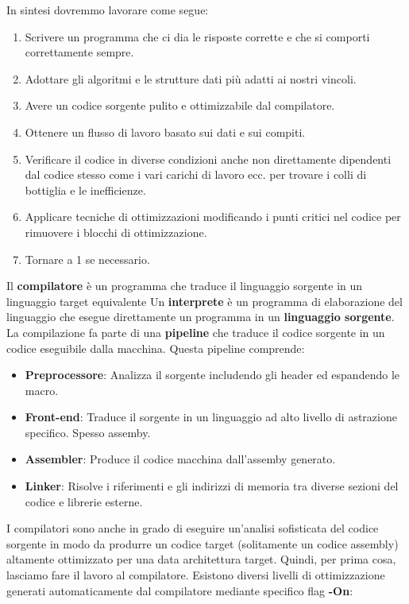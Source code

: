 In sintesi dovremmo lavorare come segue:
\begin{enumerate}
    \item Scrivere un programma che ci dia le risposte corrette e che si comporti correttamente sempre.
    \item Adottare gli algoritmi e le strutture dati più adatti ai nostri vincoli.
    \item Avere un codice sorgente pulito e ottimizzabile dal compilatore.
    \item Ottenere un flusso di lavoro basato sui dati e sui compiti.
    \item Verificare il codice in diverse condizioni anche non direttamente dipendenti dal codice stesso come i vari carichi di lavoro ecc. per trovare i colli di bottiglia e le inefficienze.
    \item Applicare tecniche di ottimizzazioni modificando i punti critici nel codice per rimuovere i blocchi di ottimizzazione.
    \item Tornare a 1 se necessario.
\end{enumerate}
Il \textbf{compilatore} è un programma che traduce il linguaggio sorgente in un linguaggio target equivalente
Un \textbf{interprete} è un programma di elaborazione del linguaggio che esegue direttamente un programma in un \textbf{linguaggio sorgente}.
La compilazione fa parte di una \textbf{pipeline} che traduce il codice sorgente in un codice eseguibile dalla macchina. Questa pipeline comprende:
\begin{itemize}
    \item \textbf{Preprocessore}: Analizza il sorgente includendo gli header ed espandendo le macro.
    \item \textbf{Front-end}: Traduce il sorgente in un linguaggio ad alto livello di astrazione specifico. Spesso assemby.
    \item \textbf{Assembler}: Produce il codice macchina dall'assemby generato.
    \item \textbf{Linker}: Risolve i riferimenti e gli indirizzi di memoria tra diverse sezioni del codice e librerie esterne.
\end{itemize}
I compilatori sono anche in grado di eseguire un’analisi sofisticata del codice sorgente in modo da produrre un codice target (solitamente un codice assembly) altamente ottimizzato per una data architettura target. Quindi, per prima cosa, lasciamo fare il lavoro al compilatore. 
Esistono diversi livelli di ottimizzazione generati automaticamente dal compilatore mediante specifico flag \textbf{-On}:
